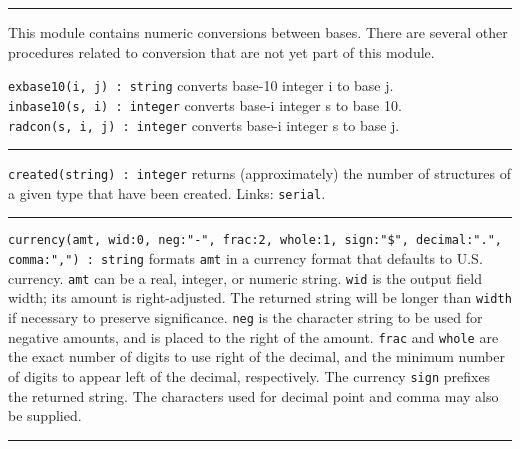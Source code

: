 

\vspace{0.25cm}\hrule{}

This module contains numeric conversions between
bases. There are several other procedures related
to conversion that are not yet part of this module. 

\texttt{exbase10(i, j) : string} converts base-10 integer i to base
j.\\
\texttt{inbase10(s, i) : integer} converts base-i integer s to base
10.\\
\texttt{radcon(s, i, j) : integer} converts base-i integer s to base j.

\vspace{0.25cm}\hrule{}

\texttt{created(string) : integer} returns (approximately) the number of
structures of a given type that have been created. Links: \texttt{serial}. 

\vspace{0.25cm}\hrule{}

\texttt{currency(amt, wid:0, neg:"-",
frac:2, whole:1, sign:"\$",
decimal:".",
comma:",") : string} formats \texttt{amt}
in a currency format that defaults to U.S. currency. \texttt{amt} can
be a real, integer, or numeric string. \texttt{wid} is the output field
width; its amount is right-adjusted. The returned string will
be longer than \texttt{width} if necessary to preserve significance.
\texttt{neg} is the character string to be used for negative amounts,
and is placed to the right of the amount. \texttt{frac} and
\texttt{whole} are the exact number of digits to use right of the
decimal, and the minimum number of digits to appear left of the
decimal, respectively. The currency \texttt{sign} prefixes the returned
string. The characters used for decimal point and comma may also be
supplied.

\vspace{0.25cm}\hrule{}

